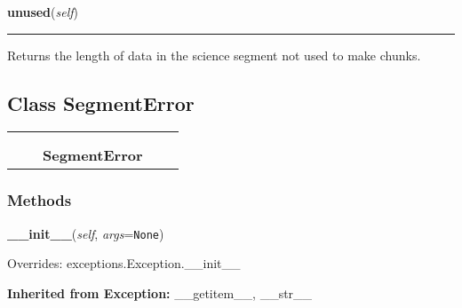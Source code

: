     \noindent\begin{boxedminipage}{\textwidth}

    \raggedright \textbf{unused}(\textit{self})

    \vspace{-1.5ex}

    \rule{\textwidth}{0.5\fboxrule}
    Returns the length of data in the science segment not used to make 
    chunks.

    \vspace{1ex}

    \end{boxedminipage}



\subsection{Class SegmentError}

    \label{pipeline:SegmentError}
\begin{tabular}{cccccc}
\multicolumn{2}{r}{\settowidth{\BCL}{exceptions.Exception}\multirow{2}{\BCL}{exceptions.Exception}}
&&
  \\\cline{3-3}
  &&\multicolumn{1}{c|}{}
&&
  \\
&&\multicolumn{2}{l}{\textbf{SegmentError}}
\end{tabular}



  \subsubsection{Methods}

    \label{pipeline:SegmentError:__init__}
    \vspace{0.5ex}

    \noindent\begin{boxedminipage}{\textwidth}

    \raggedright \textbf{\_\_init\_\_}(\textit{self}, \textit{args}=\texttt{N\-o\-n\-e\-})

      Overrides: exceptions.Exception.\_\_init\_\_

    \end{boxedminipage}

  \noindent\textbf{Inherited from Exception:}
    \_\_getitem\_\_,
    \_\_str\_\_

